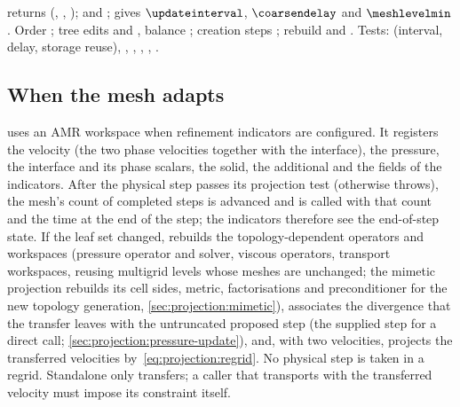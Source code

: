 \begin{implnote}
returns  (, ,
);  and
; 
gives $\updateinterval$, $\coarsendelay$ and $\meshlevelmin$. Order
; tree edits
 and
, balance
; creation steps
; rebuild
 and
. Tests:
(interval, delay, storage reuse),
,
,
,
,
.
\end{implnote}



\subsection{When the mesh adapts}\label{sec:amr:when}
 uses an AMR workspace when refinement
indicators are configured. It registers the velocity (the two phase velocities
together with the interface), the pressure, the interface and its phase
scalars, the solid, the additional  and the fields of the
indicators. After the physical step passes its projection test (otherwise
 throws), the mesh's count of completed steps is advanced and
 is called with that count and the time at the end of the
step; the indicators therefore see the end-of-step state. If the leaf set
changed,  rebuilds the topology-dependent operators and
workspaces (pressure operator and solver, viscous operators, transport
workspaces, reusing multigrid levels whose meshes are unchanged; the
mimetic projection rebuilds its cell sides, metric, factorisations and
preconditioner for the new topology generation,
\cref{sec:projection:mimetic}), associates
the divergence that the transfer leaves with the untruncated proposed step
(the supplied step for a direct call; \cref{sec:projection:pressure-update}),
and, with two velocities, projects
the transferred velocities by~\cref{eq:projection:regrid}. No physical step is
taken in a regrid. Standalone  only transfers; a caller that
transports with the transferred velocity must impose its constraint itself.

